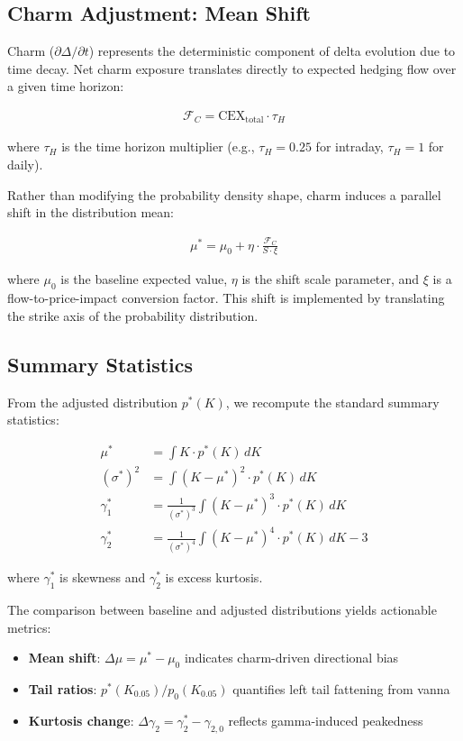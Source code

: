 \documentclass[11pt, a4paper]{article}
\begin{document}
\subsection{Charm Adjustment: Mean Shift}

Charm ($\partial \Delta / \partial t$) represents the deterministic component of delta evolution due to time decay. Net charm exposure translates directly to expected hedging flow over a given time horizon:

\begin{align}
\mathcal{F}_C = \text{CEX}_{\text{total}} \cdot \tau_H
\end{align}

where $\tau_H$ is the time horizon multiplier (e.g., $\tau_H = 0.25$ for intraday, $\tau_H = 1$ for daily).

Rather than modifying the probability density shape, charm induces a parallel shift in the distribution mean:

\begin{align}
\mu^* = \mu_0 + \eta \cdot \frac{\mathcal{F}_C}{S \cdot \xi}
\end{align}

where $\mu_0$ is the baseline expected value, $\eta$ is the shift scale parameter, and $\xi$ is a flow-to-price-impact conversion factor. This shift is implemented by translating the strike axis of the probability distribution.

\subsection{Summary Statistics}

From the adjusted distribution $p^*(K)$, we recompute the standard summary statistics:

\begin{align}
\mu^* &= \int K \cdot p^*(K) \, dK \\
(\sigma^*)^2 &= \int (K - \mu^*)^2 \cdot p^*(K) \, dK \\
\gamma_1^* &= \frac{1}{(\sigma^*)^3} \int (K - \mu^*)^3 \cdot p^*(K) \, dK \\
\gamma_2^* &= \frac{1}{(\sigma^*)^4} \int (K - \mu^*)^4 \cdot p^*(K) \, dK - 3
\end{align}

where $\gamma_1^*$ is skewness and $\gamma_2^*$ is excess kurtosis.

The comparison between baseline and adjusted distributions yields actionable metrics:

\begin{itemize}
    \item \textbf{Mean shift}: $\Delta\mu = \mu^* - \mu_0$ indicates charm-driven directional bias
    \item \textbf{Tail ratios}: $p^*(K_{0.05})/p_0(K_{0.05})$ quantifies left tail fattening from vanna
    \item \textbf{Kurtosis change}: $\Delta\gamma_2 = \gamma_2^* - \gamma_{2,0}$ reflects gamma-induced peakedness
\end{itemize}
\end{document}
